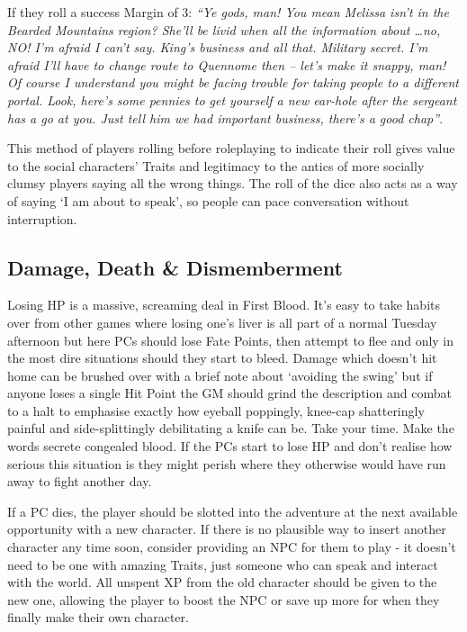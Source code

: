 If they roll a success Margin of 3: \textit{``Ye gods, man!  You mean Melissa isn't in the Bearded Mountains region?  She'll be livid when all the information about \dots no, NO! I'm afraid I can't say.  King's business and all that.  Military secret.  I'm afraid I'll have to change route to Quennome then -- let's make it snappy, man!  Of course I understand you might be facing trouble for taking people to a different portal.  Look, here's some pennies to get yourself a new ear-hole after the sergeant has a go at you.  Just tell him we had important business, there's a good chap''}.

This method of players rolling before roleplaying to indicate their roll gives value to the social characters' Traits and legitimacy to the antics of more socially clumsy players saying all the wrong things.  The roll of the dice also acts as a way of saying `I am about to speak', so people can pace conversation without interruption.

\subsection{Damage, Death \& Dismemberment}

Losing HP is a massive, screaming deal in First Blood.  It's easy to take habits over from other games where losing one's liver is all part of a normal Tuesday afternoon but here PCs should lose Fate Points, then attempt to flee and only in the most dire situations should they start to bleed.  Damage which doesn't hit home can be brushed over with a brief note about `avoiding the swing' but if anyone loses a single Hit Point the GM should grind the description and combat to a halt to emphasise exactly how eyeball poppingly, knee-cap shatteringly painful and side-splittingly debilitating a knife can be.  Take your time.  Make the words secrete congealed blood.  If the PCs start to lose HP and don't realise how serious this situation is they might perish where they otherwise would have run away to fight another day.

If a PC dies, the player should be slotted into the adventure at the next available opportunity with a new character. If there is no plausible way to insert another character any time soon, consider providing an NPC for them to play - it doesn't need to be one with amazing Traits, just someone who can speak and interact with the world.  All unspent XP from the old character should be given to the new one, allowing the player to boost the NPC or save up more for when they finally make their own character.

